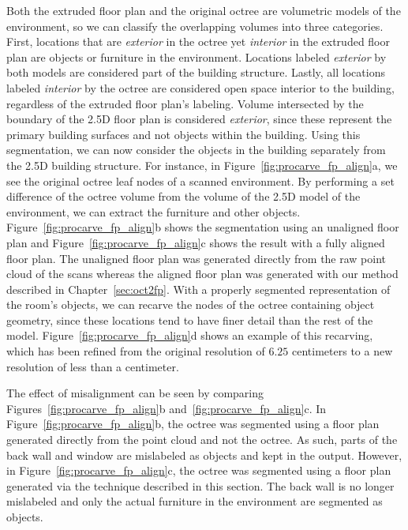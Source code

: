 \documentclass[12pt,onecolumn,oneside]{book}
\begin{document}
Both the extruded floor plan and the original octree are volumetric models of the environment, so we can classify the overlapping volumes into three categories.  First, locations that are {\it exterior} in the octree yet {\it interior} in the extruded floor plan are objects or furniture in the environment.  Locations labeled {\it exterior} by both models are considered part of the building structure.  Lastly, all locations labeled {\it interior} by the octree are considered open space interior to the building, regardless of the extruded floor plan's labeling.  Volume intersected by the boundary of the 2.5D floor plan is considered {\it exterior}, since these represent the primary building surfaces and not objects within the building.  Using this segmentation, we can now consider the objects in the building separately from the 2.5D building structure.  For instance, in Figure~\ref{fig:procarve_fp_align}a, we see the original octree leaf nodes of a scanned environment.  By performing a set difference of the octree volume from the volume of the 2.5D model of the environment, we can extract the furniture and other objects.  Figure~\ref{fig:procarve_fp_align}b shows the segmentation using an unaligned floor plan and Figure~\ref{fig:procarve_fp_align}c shows the result with a fully aligned floor plan.  The unaligned floor plan was generated directly from the raw point cloud of the scans whereas the aligned floor plan was generated with our method described in Chapter~\ref{sec:oct2fp}.  With a properly segmented representation of the room's objects, we can recarve the nodes of the octree containing object geometry, since these locations tend to have finer detail than the rest of the model.  Figure~\ref{fig:procarve_fp_align}d shows an example of this recarving, which has been refined from the original resolution of $6.25$ centimeters to a new resolution of less than a centimeter.


The effect of misalignment can be seen by comparing Figures~\ref{fig:procarve_fp_align}b and~\ref{fig:procarve_fp_align}c.  In Figure~\ref{fig:procarve_fp_align}b, the octree was segmented using a floor plan generated directly from the point cloud and not the octree.  As such, parts of the back wall and window are mislabeled as objects and kept in the output.  However, in Figure~\ref{fig:procarve_fp_align}c, the octree was segmented using a floor plan generated via the technique described in this section.  The back wall is no longer mislabeled and only the actual furniture in the environment are segmented as objects.
\end{document}
